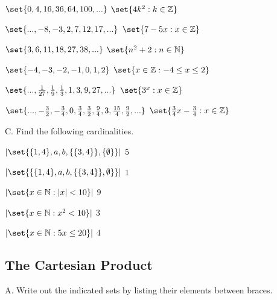 \documentclass[DIN, pagenumber=false, fontsize=11pt, parskip=half]{scrartcl}
\begin{document}
\begin{problems}[from=18]
    \problem $\set{0,4,16,36,64,100,...}$
    \answer  $\set{4k^2 : k \in \mathbb{Z}}$

    \problem $\set{...,-8,-3,2,7,12,17,...}$
    \answer  $\set{7-5x : x \in \mathbb{Z}}$

    \problem $\set{3,6,11,18,27,38,...}$
    \answer  $\set{n^2 + 2 : n \in \mathbb{N}}$

    \problem $\set{-4,-3,-2,-1,0,1,2}$
    \answer  $\set{x \in \mathbb{Z} : -4 \leq x \leq 2}$

    \problem $\set{...,\frac{1}{27},\frac{1}{9},\frac{1}{3},1,3,9,27,...}$
    \answer  $\set{3^x : x \in \mathbb{Z}}$

    \problem $\set{...,-\frac{3}{2},-\frac{3}{4},0,\frac{3}{4},\frac{3}{2},\frac{9}{4},3,\frac{15}{4},\frac{9}{2},...}$
    \answer  $\set{\frac{3}{4}x-\frac{3}{4} : x \in \mathbb{Z}}$
\end{problems}

\begin{exercise}{C.}
    Find the following cardinalities.
\end{exercise}

\begin{problems}[from=30]
    \problem $\abs{\set{\{1,4\}, a, b, \{\{3,4\}\},\{\emptyset\}}}$
    \answer  $5$

    \problem $\abs{\set{\{\{1,4\},a,b,\{\{3,4\}\},\emptyset\}}}$
    \answer  $1$

    \problem $\abs{\set{x\in\mathbb{N} : \abs{x} < 10}}$
    \answer  $9$

    \problem $\abs{\set{x \in \mathbb{N} : x^2 < 10}}$
    \answer  $3$

    \problem $\abs{\set{x \in \mathbb{N} : 5x \leq 20}}$
    \answer  $4$
\end{problems}

\subsection{The Cartesian Product}

\begin{exercise}{A.}
    Write out the indicated sets by listing their elements between braces.
\end{exercise}
\end{document}
